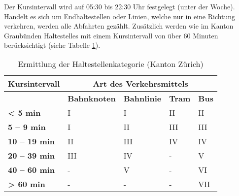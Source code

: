 Der Kursintervall wird auf 05:30 bis 22:30 Uhr festgelegt (unter der Woche).
Handelt es sich um Endhaltestellen oder Linien, welche nur in eine Richtung verkehren, werden alle Abfahrten gezählt.
Zusätzlich werden wie im Kanton Graubünden  \glspl{Haltestelle} mit einem Kursintervall von über 60 Minuten berücksichtigt (siehe Tabelle \ref{table:Ermittlung der Haltestellenkategorie (Kanton Zürich)}).

\begin{table}[ht]
    \begin{tabular}[c]{l p{2.9cm} p{2.8cm} p{2.8cm} p{2.8cm}}
        \toprule
        \textbf{Kursintervall}
                                & \multicolumn{4}{c}{\textbf{Art des Verkehrsmittels}}\\
        \midrule
        \textbf{}
                                & \textbf{Bahnknoten}
                                & \textbf{Bahnlinie}
                                & \textbf{Tram}
                                & \textbf{Bus}\\
        \textbf{< 5 min}
                                & I
                                & I
                                & II
                                & II\\
        \textbf{5 -- 9 min}
                                & I
                                & II
                                & III
                                & III\\
        \textbf{10 -- 19 min}
                                & II
                                & III
                                & IV
                                & IV\\
        \textbf{20 -- 39 min}
                                & III
                                & IV
                                & -
                                & V\\
        \textbf{40 -- 60 min}
                                & -
                                & V
                                & -
                                & VI\\
        \cellcolor{red!25}\textbf{> 60 min}
                                & -
                                & -
                                & -
                                & \cellcolor{red!25}VII\\
        \bottomrule
    \end{tabular}
    \caption{Ermittlung der Haltestellenkategorie (Kanton Zürich)}
    \label{table:Ermittlung der Haltestellenkategorie (Kanton Zürich)}
\end{table}


